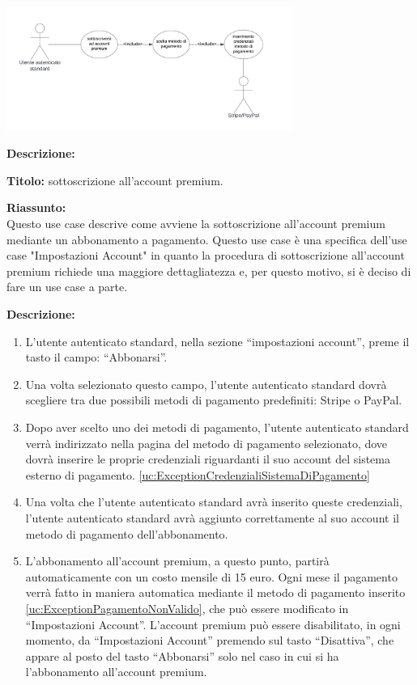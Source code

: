 \begin{listaPersonale}[UC]{}
    \newpage

    \begin{center}
        \includegraphics[width=0.7\textwidth]{img/Diagrammi/UseCases/UtentePremium.png}
    \end{center}

    \textbf{Descrizione:}

    \textbf{Titolo:} sottoscrizione all'account premium.

    \textbf{Riassunto:} \\
    Questo use case descrive come avviene la sottoscrizione all'account premium mediante un abbonamento a pagamento.
    Questo use case è una specifica dell'use case "Impostazioni Account" in quanto la procedura di sottoscrizione all'account premium richiede una maggiore dettagliatezza e, per questo motivo, si è deciso di fare un use case a parte.

    \textbf{Descrizione:}
    \begin{enumerate}
        \item L'utente autenticato standard, nella sezione “impostazioni account”, preme il tasto il campo: “Abbonarsi”.
        \item Una volta selezionato questo campo, l'utente autenticato standard dovrà scegliere tra due possibili metodi di pagamento predefiniti: Stripe o PayPal.
        \item Dopo aver scelto uno dei metodi di pagamento, l'utente autenticato standard verrà indirizzato nella pagina del metodo di pagamento selezionato, dove dovrà inserire le proprie credenziali riguardanti il suo account del sistema esterno di pagamento. \ref{uc:ExceptionCredenzialiSistemaDiPagamento}
        \item Una volta che l'utente autenticato standard avrà inserito queste credenziali, l'utente autenticato standard avrà aggiunto correttamente al suo account il metodo di pagamento dell'abbonamento.
        \item L'abbonamento all'account premium, a questo punto, partirà automaticamente con un costo mensile di 15 euro. Ogni mese il pagamento verrà fatto in maniera automatica mediante il metodo di pagamento inserito \ref{uc:ExceptionPagamentoNonValido}, che può essere modificato in “Impostazioni Account”. L'account premium può essere disabilitato, in ogni momento, da “Impostazioni Account” premendo sul tasto “Disattiva”, che appare al posto del tasto “Abbonarsi” solo nel caso in cui si ha l'abbonamento all'account premium.
    \end{enumerate}


\end{listaPersonale}
